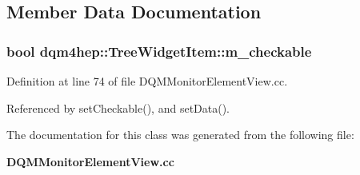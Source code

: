 \subsection{Member Data Documentation}
\subsubsection[{m\+\_\+checkable}]{\setlength{\rightskip}{0pt plus 5cm}bool dqm4hep\+::\+Tree\+Widget\+Item\+::m\+\_\+checkable\hspace{0.3cm}{\ttfamily [private]}}\label{classdqm4hep_1_1TreeWidgetItem_ab9bfc2a05189c9ef303da9d213d5dc1f}


Definition at line 74 of file D\+Q\+M\+Monitor\+Element\+View.\+cc.



Referenced by set\+Checkable(), and set\+Data().



The documentation for this class was generated from the following file\+:\begin{DoxyCompactItemize}
\item 
{\bf D\+Q\+M\+Monitor\+Element\+View.\+cc}\end{DoxyCompactItemize}
